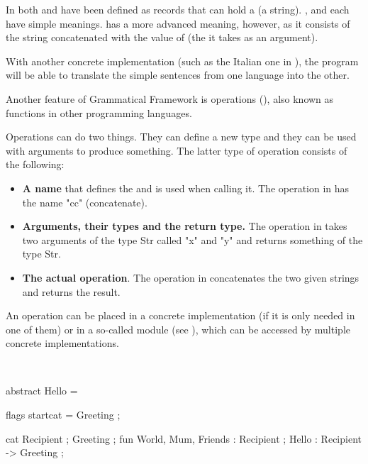 In  both  and  have been defined as records that can hold a  (a string). ,  and  each have simple meanings.  has a more advanced meaning, however, as it consists of the string  concatenated with the value of  (the  it takes as an argument).



With another concrete implementation (such as the Italian one in ), the program will be able to translate the simple sentences from one language into the other. 

Another feature of Grammatical Framework is operations (), also known as functions in other programming languages.


Operations can do two things. They can define a new type and they can be used with arguments to produce something. The latter type of operation consists of the following:
\begin{itemize}
\item \textbf{A name} that defines the  and is used when calling it. The operation in  has the name "cc" (concatenate).

\item \textbf{Arguments, their types and the return type.} The operation in  takes two arguments of the type Str called "x" and "y" and returns something of the type Str.

\item \textbf{The actual operation}. The operation in  concatenates the two given strings and returns the result.
\end{itemize}


An operation can be placed in a concrete implementation (if it is only needed in one of them) or in a so-called  module (see ), which can be accessed by multiple concrete implementations.

\\



\begin{lstgf}
abstract Hello = {
    flags startcat = Greeting ;
    
    cat 
        Recipient ; Greeting ;
    fun 
        World, Mum, Friends : Recipient ;
        Hello : Recipient -> Greeting ;
}
\end{lstgf}
